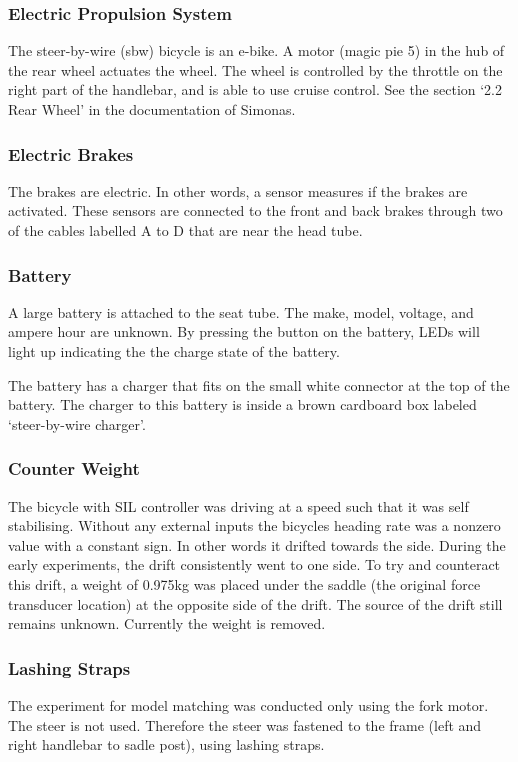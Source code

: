 \subsubsection{Electric Propulsion System}
The steer-by-wire (sbw) bicycle is an e-bike. 
A motor (magic pie 5) in the hub of the rear wheel actuates the wheel.
The wheel is controlled by the throttle on the right part of the handlebar, and is able to use cruise control.
See the section `2.2 Rear Wheel' in the documentation of Simonas.

\subsubsection{Electric Brakes}
The brakes are electric.
In other words, a sensor measures if the brakes are activated.
These sensors are connected to the front and back brakes through two of the cables labelled A to D that are near the head tube.

\subsubsection{Battery}
A large battery is attached to the seat tube.
The make, model, voltage, and ampere hour are unknown.
By pressing the button on the battery, LEDs will light up indicating the the charge state of the battery.

The battery has a charger that fits on the small white connector at the top of the battery.
The charger to this battery is inside a brown cardboard box labeled `steer-by-wire charger'. 

\subsubsection{Counter Weight}
The bicycle with SIL controller was driving at a speed such that it was self stabilising.
Without any external inputs the bicycles heading rate was a nonzero value with a constant sign. 
In other words it drifted towards the side.
During the early experiments, the drift consistently went to one side.
To try and counteract this drift, a weight of 0.975kg was placed under the saddle (the original force transducer location) at the opposite side of the drift. 
The source of the drift still remains unknown.
Currently the weight is removed.

\subsubsection{Lashing Straps}
The experiment for model matching was conducted only using the fork motor. 
The steer is not used. 
Therefore the steer was fastened to the frame (left and right handlebar to sadle post), using lashing straps.

